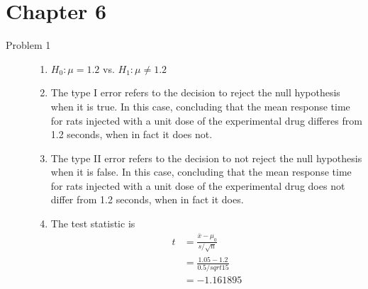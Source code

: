 \documentclass{article}\usepackage[]{graphicx}\usepackage[]{color}
\begin{document}
\section{Chapter 6}

\begin{description}

  \item[Problem 1]

  \begin{enumerate}

    \item $H_0: \mu = 1.2$ vs. $H_1: \mu \ne 1.2$
    
    \item The type I error refers to the decision to reject the null hypothesis when it is true. In this case, concluding that the mean response time for rats injected with a unit dose of the experimental drug differes from 1.2 seconds, when in fact it does not.
    
    \item The type II error refers to the decision to not reject the null hypothesis when it is false. In this case, concluding that the mean response time for rats injected with a unit dose of the experimental drug does not differ from 1.2 seconds, when in fact it does.
    
    \item The test statistic is
    \begin{align*}
      t &= \frac{\bar{x} - \mu_0}{s / \sqrt{n}} \\
        &= \frac{1.05 - 1.2}{0.5 / sqrt{15}} \\
        &= -1.161895
    \end{align*}
    

\end{enumerate}
\end{description}
\end{document}
